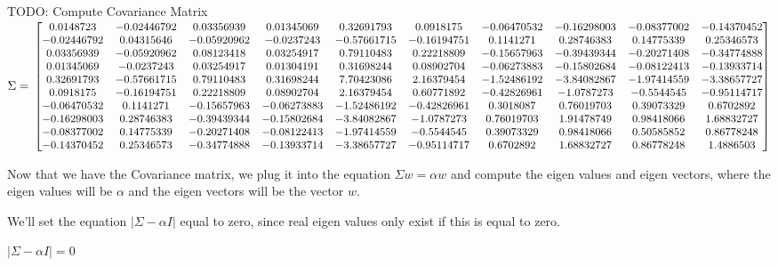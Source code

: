 \documentclass[12pt]{article}
\begin{document}
\begin{enumerate}
\begin{enumerate}
TODO: Compute Covariance Matrix
$
\Sigma = \newline
\small
\begin{bmatrix}
0.0148723 & -0.02446792 & 0.03356939 &  0.01345069 & 0.32691793 & 0.0918175 & -0.06470532 & -0.16298003 & -0.08377002 & -0.14370452\\
-0.02446792 & 0.04315646 & -0.05920962 & -0.0237243 & -0.57661715 & -0.16194751 & 0.1141271 & 0.28746383 &  0.14775339 & 0.25346573\\
0.03356939 & -0.05920962 & 0.08123418 & 0.03254917 & 0.79110483 & 0.22218809 & -0.15657963 & -0.39439344 & -0.20271408 & -0.34774888\\
0.01345069 & -0.0237243 & 0.03254917 & 0.01304191 & 0.31698244 & 0.08902704 & -0.06273883 & -0.15802684 & -0.08122413 & -0.13933714\\
0.32691793 & -0.57661715 & 0.79110483 & 0.31698244 &  7.70423086 & 2.16379454 & -1.52486192 & -3.84082867 & -1.97414559 & -3.38657727\\
0.0918175 & -0.16194751 & 0.22218809 & 0.08902704 & 2.16379454 & 0.60771892 & -0.42826961 & -1.0787273 & -0.5544545 & -0.95114717\\
-0.06470532 & 0.1141271 & -0.15657963 & -0.06273883 & -1.52486192 & -0.42826961 &  0.3018087 & 0.76019703 & 0.39073329 & 0.6702892\\
-0.16298003 & 0.28746383 & -0.39439344 & -0.15802684 & -3.84082867 & -1.0787273 & 0.76019703 & 1.91478749 & 0.98418066 & 1.68832727\\
-0.08377002 & 0.14775339 & -0.20271408 & -0.08122413 & -1.97414559 & -0.5544545 & 0.39073329 & 0.98418066 & 0.50585852 & 0.86778248\\
-0.14370452 & 0.25346573 & -0.34774888 & -0.13933714 & -3.38657727 & -0.95114717 & 0.6702892 & 1.68832727 & 0.86778248 & 1.4886503\\
\end{bmatrix}
$
\normalsize

Now that we have the Covariance matrix, we plug it into the equation $\Sigma w = \alpha w$ and compute the eigen values and eigen vectors, where the eigen values will be $\alpha$ and the eigen vectors will be the vector $w$.\newline

We'll set the equation $|\Sigma - \alpha I|$ equal to zero, since real eigen values only exist if this is equal to zero.\newline

$|\Sigma - \alpha I| = 0$\newline



\end{enumerate}
\end{enumerate}
\end{document}

